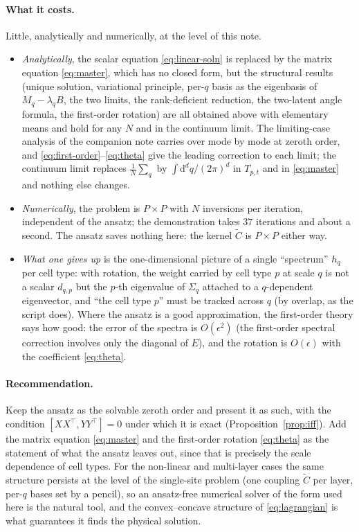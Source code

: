 \documentclass[11pt,a4paper]{article}
\newcommand{\Ct}{\tilde C}
\begin{document}
\paragraph{What it costs.}
Little, analytically and numerically, at the level of this note.
\begin{itemize}
  \item \emph{Analytically}, the scalar equation \eqref{eq:linear-soln} is replaced by the matrix equation \eqref{eq:master}, which has no closed form, but the structural results (unique solution, variational principle, per-$q$ basis as the eigenbasis of $M_q - \lambda_q B$, the two limits, the rank-deficient reduction, the two-latent angle formula, the first-order rotation) are all obtained above with elementary means and hold for any $N$ and in the continuum limit. The limiting-case analysis of the companion note  carries over mode by mode at zeroth order, and \eqref{eq:first-order}--\eqref{eq:theta} give the leading correction to each limit; the continuum limit replaces $\frac1N\sum_q$ by $\int\mathrm d^dq/(2\pi)^d$ in $T_{p,t}$ and in \eqref{eq:master} and nothing else changes.
  \item \emph{Numerically}, the problem is $P\times P$ with $N$ inversions per iteration, independent of the ansatz; the demonstration takes $37$ iterations and about a second. The ansatz saves nothing here: the kernel $\Ct$ is $P\times P$ either way.
  \item \emph{What one gives up} is the one-dimensional picture of a single ``spectrum'' $h_q$ per cell type: with rotation, the weight carried by cell type $p$ at scale $q$ is not a scalar $d_{q,p}$ but the $p$-th eigenvalue of $\Sigma_q$ attached to a $q$-dependent eigenvector, and ``the cell type $p$'' must be tracked across $q$ (by overlap, as the script does). Where the ansatz is a good approximation, the first-order theory says how good: the error of the spectra is $O(\epsilon^2)$ (the first-order spectral correction involves only the diagonal of $E$), and the rotation is $O(\epsilon)$ with the coefficient \eqref{eq:theta}.
\end{itemize}

\paragraph{Recommendation.}
Keep the ansatz as the solvable zeroth order and present it as such, with the condition $[XX^\top,YY^\top] = 0$ under which it is exact (Proposition~\ref{prop:iff}). Add the matrix equation \eqref{eq:master} and the first-order rotation \eqref{eq:theta} as the statement of what the ansatz leaves out, since that is precisely the scale dependence of cell types. For the non-linear and multi-layer cases the same structure persists at the level of the single-site problem (one coupling $\Ct$ per layer, per-$q$ bases set by a pencil), so an ansatz-free numerical solver of the form used here is the natural tool, and the convex--concave structure of \eqref{eq:lagrangian} is what guarantees it finds the physical solution.
\end{document}
